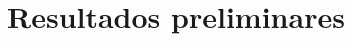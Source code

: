 \documentclass[12pt,openright,twoside,a4paper,english,french,spanish,brazil]{abntex2}
\begin{document}
%
%
%
%
%


\chapter{Resultados preliminares}
\end{document}
